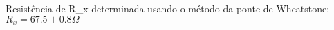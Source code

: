 
Resistência de R_x determinada usando o método da ponte de Wheatstone:
$R_x = 67.5 \pm 0.8 \Omega$

